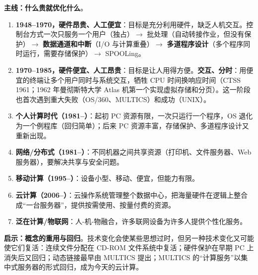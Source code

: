 \textbf{主线：什么贵就优化什么}。
\begin{enumerate}
    \item \textbf{1948–1970，硬件昂贵、人工便宜}：目标是充分利用硬件，缺乏人机交互。控制台方式一次只服务一个用户（独占）$\to$ 批处理（自动转接作业，但没有保护）$\to$ \textbf{数据通道和中断}（I/O 与计算重叠）$\to$ \textbf{多道程序设计}（多个程序同时运行，需要存储保护）$\to$ SPOOLing。
    \item \textbf{1970–1985，硬件便宜、人工昂贵}：目标是让人用得方便。\textbf{交互、分时}：用便宜的终端让多个用户同时与系统交互，牺牲 CPU 时间换响应时间（CTSS 1961；1962 年曼彻斯特大学 Atlas 机第一个实现虚拟存储和分页）。这一阶段也首次遇到重大失败（OS/360、MULTICS）和成功（UNIX）。
    \item \textbf{个人计算时代（1981–）}：起初 PC 资源有限，一次只运行一个程序，OS 退化为一个例程库（回归简单）；后来 PC 资源丰富，存储保护、多道程序设计又重新出现。
    \item \textbf{网络/分布式（1981–）}：不同机器之间共享资源（打印机、文件服务器、Web 服务器），要解决共享与安全问题。
    \item \textbf{移动计算（1995–）}：设备小型、移动、便宜，但能力有限。
    \item \textbf{云计算（2006–）}：云操作系统管理整个数据中心，把海量硬件在逻辑上整合成“一台服务器”，提供按需使用、按量付费的资源。
    \item \textbf{泛在计算/物联网}：人-机-物融合，许多联网设备为许多人提供个性化服务。
\end{enumerate}
\textbf{启示：概念的重用与回归}。技术变化会使某些思想过时，但另一种技术变化又可能使它们复活：连续文件分配在 CD-ROM 文件系统中复活；硬件保护在早期 PC 上消失后又回归；动态链接最早由 MULTICS 提出；MULTICS 的“计算服务”以集中式服务器的形式回归，成为今天的云计算。

